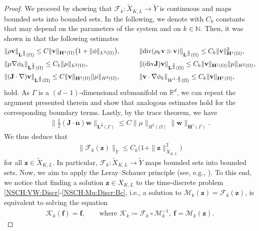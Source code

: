 \documentclass[11pt,reqno]{amsart}
\theoremstyle{remark}
\numberwithin{equation}{section}
\newcommand{\norm}[1]{\| #1 \|}
\newcommand{\R}{\mathbb R}
\newcommand{\N}{\mathbb N}
\newcommand{\n}{\mathbf{n}}
\newcommand{\Grad}{\nabla}
\newcommand{\Div}{\textnormal{div}}
\newcommand{\Om}{\Omega}
\newcommand{\Ga}{\Gamma}
\newcommand{\J}{\mathbf J}
\newcommand{\bv}{\mathbf v}
\newcommand{\bw}{\mathbf w}
\begin{document}
\begin{proof}
    We proceed by showing that $\mathcal{F}_k:\widetilde{X}_{K,L}\rightarrow\widetilde{Y}$ is continuous and maps bounded sets into bounded sets. In the following, we denote with $C_k$ constants that may depend on the parameters of the system and on $k\in\N$. Then, it was shown in \cite[(i)-(vi), pp. 467]{Abels2013} that the following estimates
    \begin{alignat*}{2}
        &\norm{\rho\bv}_{\mathbf{L}^{\frac32}(\Om)}\leq C\norm{\bv}_{\mathbf{H}^1(\Om)}\big(1+\norm{\phi}_{L^2(\Om)}\big), &&\qquad \norm{\Div(\rho_k\bv\otimes\bv)}_{\mathbf{L}^{\frac32}(\Om)} \leq C_k\norm{\bv}_{\mathbf{H}^1(\Om)}^2, \\
        &\norm{\mu\Grad\phi_k}_{\mathbf{L}^{\frac32}(\Om)}\leq C_k\norm{\mu}_{L^2(\Om)}, &&\qquad\norm{(\Div\J)\bv}_{\mathbf{L}^{\frac32}(\Om)} \leq C_k\norm{\bv}_{\mathbf{H}^1(\Om)}\norm{\mu}_{H^2(\Om)}, \\
        &\norm{(\J\cdot\Grad)\bv}_{\mathbf{L}^{\frac32}(\Om)} \leq C\norm{\bv}_{\mathbf{H}^1(\Om)}\norm{\mu}_{H^2(\Om)}, &&\qquad\norm{\bv\cdot\Grad\phi_k}_{W^{1,\frac32}(\Om)}\leq C_k\norm{\bv}_{\mathbf{H}^1(\Om)},
    \end{alignat*}
    hold. As $\Ga$ is a $(d-1)$-dimensional submanifold on $\R^d$, we can repeat the argument presented therein and show that analogous estimates hold for the corresponding boundary terms. Lastly, by the trace theorem, we have
    \begin{align*}
    	\norm{\tfrac12(\J\cdot\n)\bw}_{\mathbf{L}^{\frac32}(\Ga)} \leq C\norm{\mu}_{H^2(\Om)}\norm{\bw}_{\mathbf{H}^1(\Ga)}.
    \end{align*}
We thus deduce that
\begin{align}\label{F_k:bounded}
	\norm{\mathcal{F}_k(\mathbf z)}_{\widetilde Y} \leq C_k\Big(1 + \norm{\mathbf z}_{\widetilde X_{K,L}}^2\Big)
\end{align}    
for all $\mathbf z\in\widetilde X_{K,L}$. In particular, $\mathcal{F}_k:\widetilde{X}_{K,L}\rightarrow\widetilde{Y}$ maps bounded sets into bounded sets.
Now, we aim to apply the Leray--Schauer principle (see, e.g., \cite[Theorem 6.A]{Zeidler1986}). To this end, we notice that finding a solution $\mathbf{z}\in X_{K,L}$ to the time-discrete problem \eqref{NSCH:VW:Discr}-\eqref{NSCH:Mu:Discr:Bc}, i.e., a solution to $\mathcal{M}_k(\mathbf{z}) = \mathcal{F}_k(\mathbf{z})$, is equivalent to solving the equation
\begin{align*}
    \mathcal{K}_k(\mathbf{f}) = \mathbf{f}, \qquad\text{where~}\mathcal{K}_k \coloneqq\mathcal{F}_k\circ\mathcal{M}_k^{-1}, \ \mathbf{f} = \mathcal{M}_k(\mathbf{z}).

\end{align*}
\end{proof}
\end{document}
